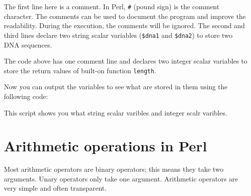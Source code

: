 \documentclass[]{book}
\makeatletter
\newenvironment{Shaded}{\begin{snugshade}}{\end{snugshade}}
\newcommand{\CharTok}[1]{\textcolor[rgb]{0.31,0.60,0.02}{#1}}
\newcommand{\CommentTok}[1]{\textcolor[rgb]{0.56,0.35,0.01}{\textit{#1}}}
\newcommand{\DataTypeTok}[1]{\textcolor[rgb]{0.13,0.29,0.53}{#1}}
\newcommand{\FunctionTok}[1]{\textcolor[rgb]{0.00,0.00,0.00}{#1}}
\newcommand{\KeywordTok}[1]{\textcolor[rgb]{0.13,0.29,0.53}{\textbf{#1}}}
\newcommand{\NormalTok}[1]{#1}
\newcommand{\StringTok}[1]{\textcolor[rgb]{0.31,0.60,0.02}{#1}}
\newenvironment{kframe}{%
\medskip{}
\setlength{\fboxsep}{.8em}
 \def\at@end@of@kframe{}%
 \ifinner\ifhmode%
  \def\at@end@of@kframe{\end{minipage}}%
  \begin{minipage}{\columnwidth}%
 \fi\fi%
 \def\FrameCommand##1{\hskip\@totalleftmargin \hskip-\fboxsep
 \colorbox{shadecolor}{##1}\hskip-\fboxsep
     \hskip-\linewidth \hskip-\@totalleftmargin \hskip\columnwidth}%
 \MakeFramed {\advance\hsize-\width
   \@totalleftmargin\z@ \linewidth\hsize
   \@setminipage}}%
 {\par\unskip\endMakeFramed%
 \at@end@of@kframe}
\renewenvironment{Shaded}{\begin{kframe}}{\end{kframe}}
\makeatother
\begin{document}
The first line here is a comment. In Perl, \texttt{\#} (pound sign) is the comment character. The comments can be used to document the program and improve the readability. During the execution, the comments will be ignored. The second and third lines declare two string scalar variables (\texttt{\$dna1} and \texttt{\$dna2}) to store two DNA sequences.

\begin{Shaded}
\end{Shaded}

The code above has one comment line and declares two integer scalar variables to store the return values of built-on function \texttt{length}.

Now you can output the variables to see what are stored in them using the following code:

\begin{Shaded}
\end{Shaded}

This script shows you what string scalar varibles and integer scalr varibles.

\hypertarget{arithmetic-operations-in-perl}{%
\section{Arithmetic operations in Perl}\label{arithmetic-operations-in-perl}}

Most arithmetic operators are binary operators; this means they take two arguments. Unary operators only take one argument. Arithmetic operators are very simple and often transparent.
\end{document}
